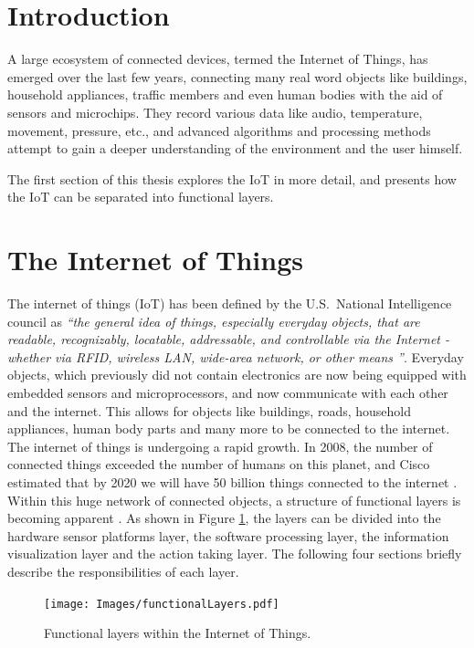 


\section{Introduction}
\label{sec:introduction}
A large ecosystem of connected devices, termed the Internet of Things, has emerged over the last few years, connecting many real word objects like buildings, household appliances, traffic members and even human bodies with the aid of sensors and microchips.
They record various data like audio, temperature, movement, pressure, etc., and advanced algorithms and processing methods attempt to gain a deeper understanding of the environment and the user himself.

The first section of this thesis explores the IoT in more detail, and presents how the IoT can be separated into functional layers.

\section{The Internet of Things}
\label{sec:internetOfThings}
The internet of things (IoT) has been defined by the U.S.\ National Intelligence council as \emph{``the general idea of things, especially everyday objects, that are readable, recognizably, locatable, addressable, and controllable via the Internet - whether via RFID, wireless LAN, wide-area network, or other means \cite{disruptiveTechnologies}''}.
Everyday objects, which previously did not contain electronics are now being equipped with embedded sensors and microprocessors, and now communicate with each other and the internet. 
This allows for objects like buildings, roads, household appliances, human body parts and many more to be connected to the internet. 
The internet of things is undergoing a rapid growth. 
In 2008, the number of connected things exceeded the number of humans on this planet, and Cisco estimated that by 2020 we will have 50 billion things connected to the internet \cite{evans12}. 
Within this huge network of connected objects, a structure of functional layers is becoming apparent \cite{swan12}. 
As shown in Figure \ref{fig:functionalLayers}, the layers can be divided into the hardware sensor platforms layer, the software processing layer, the information visualization layer and the action taking layer. 
The following four sections briefly describe the responsibilities of each layer.
\begin{figure}[!t]
\centering
\texttt{[image: Images/functionalLayers.pdf]}
\caption{Functional layers within the Internet of Things.}
\label{fig:functionalLayers}
\end{figure}

